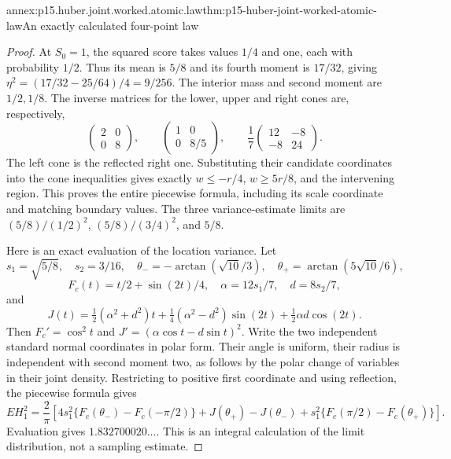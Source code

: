 \begin{annexitem}{annex:p15.huber.joint.worked.atomic.law}{thm:p15-huber-joint-worked-atomic-law}{An exactly calculated four-point law}
\begin{proof}
At \(S_0=1\), the squared score takes values \(1/4\) and one,
each with probability \(1/2\). Thus its mean is \(5/8\) and
its fourth moment is \(17/32\), giving
\(\eta^2=(17/32-25/64)/4=9/256\).
The interior mass and second moment are \(1/2,1/8\).
The inverse matrices for the lower, upper and right cones are,
respectively,
\[
 \begin{pmatrix}2&0\\0&8\end{pmatrix},\qquad
 \begin{pmatrix}1&0\\0&8/5\end{pmatrix},\qquad
 \frac17\begin{pmatrix}12&-8\\-8&24\end{pmatrix}.
\]
The left cone is the reflected right one.
Substituting their candidate coordinates into the cone inequalities
gives exactly \(w\leq-r/4\), \(w\geq5r/8\), and the intervening
region. This proves the entire piecewise formula, including its
scale coordinate and matching boundary values.
The three variance-estimate limits are
\((5/8)/(1/2)^2\), \((5/8)/(3/4)^2\), and \(5/8\).

Here is an exact evaluation of the location variance.
Let
\[
 s_1=\sqrt{5/8},\quad s_2=3/16,\quad
 \theta_-=-\arctan(\sqrt{10}/3),\quad
 \theta_+=\arctan(5\sqrt{10}/6),
\]
\[
 F_c(t)=t/2+\sin(2t)/4,\quad
 \alpha=12s_1/7,\quad d=8s_2/7,
\]
and
\[
 J(t)=\tfrac12(\alpha^2+d^2)t
       +\tfrac14(\alpha^2-d^2)\sin(2t)
       +\tfrac12\alpha d\cos(2t).
\]
Then \(F_c'=\cos^2t\) and
\(J'=(\alpha\cos t-d\sin t)^2\).
Write the two independent standard normal coordinates in polar
form. Their angle is uniform, their radius is independent with
second moment two, as follows by the polar change of variables
in their joint density. Restricting to positive first coordinate
and using reflection, the piecewise formula gives
\[
 EH_1^2=\frac2\pi\left[
 4s_1^2\{F_c(\theta_-)-F_c(-\pi/2)\}
 +J(\theta_+)-J(\theta_-)
 +s_1^2\{F_c(\pi/2)-F_c(\theta_+)\}\right].
\]
Evaluation gives \(1.832700020\ldots\).
This is an integral calculation of the limit distribution,
not a sampling estimate.
\end{proof}
\end{annexitem}

